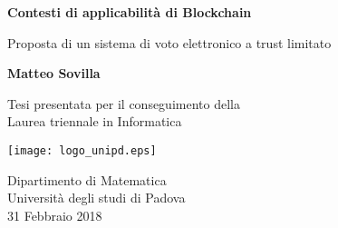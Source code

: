 \begin{titlepage}
    \begin{center}
        \vspace*{1cm}
        
        \Huge
        \textbf{Contesti di applicabilità di Blockchain}
        
        \vspace{0.5cm}
        \large
        Proposta di un sistema di voto elettronico a trust limitato
        
        \vspace{1.5cm}
        
        \textbf{Matteo Sovilla}
        
        \vspace{1cm}
        
        Tesi presentata per il conseguimento della\\
        Laurea triennale in Informatica
        
        \vspace{0.8cm}
        
        \texttt{[image: logo\_unipd.eps]}

        \vspace{0.5cm}
        
        \large
        Dipartimento di Matematica\\
        Università degli studi di Padova\\
        31 Febbraio 2018
        
    \end{center}
\end{titlepage}